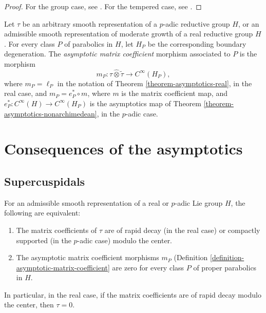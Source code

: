 \begin{proof}
 For the group case, see \cite[4.4]{Wallach-RR1}. For the tempered case, see \cite{Delorme-Kroetz-Souaifi}.
\end{proof}

\begin{definition}
 \label{definition-asymptotic-matrix-coefficient}
Let $\tau$ be an arbitrary smooth representation of a $p$-adic reductive group $H$, or an admissible smooth representation of moderate growth of a real reductive group $H$. For every class $P$ of parabolics in $H$, let $H_P$ be the corresponding boundary degeneration. The {\it asymptotic matrix coefficient} morphism associated to $P$ is the morphism 
$$m_P: \tau\hat\otimes\tilde\tau \to C^\infty(H_P),$$
where $m_P = \ell_P$ in the notation of Theorem \ref{theorem-asymptotics-real}, in the real case, and $m_P = e_P^*\circ m$, where $m$ is the matrix coefficient map, and $e_P^*: C^\infty(H)\to C^\infty(H_P)$ is the asymptotics map of Theorem \ref{theorem-asymptotics-nonarchimedean}, in the $p$-adic case.
\end{definition}



\section{Consequences of the asymptotics}
\label{section-consequences-asymptotics}

\subsection{Supercuspidals}
\label{subsection-supercuspidals}


\begin{proposition}
 \label{proposition-compact-matrix-coefficients}
For an admissible smooth representation of a real or $p$-adic Lie group $H$, the following are equivalent:
\begin{enumerate}
 \item The matrix coefficients of $\tau$ are of rapid decay (in the real case) or compactly supported (in the $p$-adic case) modulo the center.
 \item The asymptotic matrix coefficient morphisms $m_P$ (Definition \ref{definition-asymptotic-matrix-coefficient} are zero for every class $P$ of proper parabolics in $H$. 
\end{enumerate}

 In particular, in the real case, if the matrix coefficients are of rapid decay modulo the center, then $\tau=0$.
\end{proposition}


